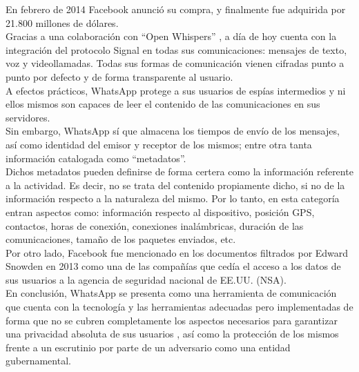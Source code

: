 En febrero de 2014 Facebook anunció su compra, y finalmente fue adquirida por 21.800 millones de dólares. \\

Gracias a una colaboración con \hyphenquote{spanish}{Open Whispers} \cite{WikiOpenWhisper}, a día de hoy cuenta con la integración del protocolo Signal \cite{WikiSignal} \cite{OWSWhatsApp01} \cite{OWSWhatsApp02} en todas sus comunicaciones: mensajes de texto, voz y videollamadas. Todas sus formas de comunicación vienen cifradas punto a punto por defecto y de forma transparente al usuario. \cite{WhatsAppWhitepaper} \cite{WhatsAppSecurity} \\

A efectos prácticos, WhatsApp protege a sus usuarios de espías intermedios y ni ellos mismos son capaces de leer el contenido de las comunicaciones en sus servidores. \\

Sin embargo, WhatsApp sí que almacena los tiempos de envío de los mensajes, así como identidad del emisor y receptor de los mismos; entre otra tanta información catalogada como \hyphenquote{spanish}{metadatos}. \\

Dichos metadatos pueden definirse de forma certera como la información referente a la actividad. Es decir, no se trata del contenido propiamente dicho, si no de la información respecto a la naturaleza del mismo. Por lo tanto, en esta categoría entran aspectos como: información respecto al dispositivo, posición GPS, contactos, horas de conexión, conexiones inalámbricas, duración de las comunicaciones, tamaño de los paquetes enviados, etc. \\

Por otro lado, Facebook fue mencionado en los documentos filtrados por Edward Snowden en 2013 como una de las compañías que cedía el acceso a los datos de sus usuarios a la agencia de seguridad nacional de EE.UU. (NSA). \cite{NSAGmailFacebook} \\

En conclusión, WhatsApp se presenta como una herramienta de comunicación que cuenta con la tecnología y las herramientas adecuadas \cite{OWSWhatsApp03} \cite{WhatsAppEncryptionTheIndependent} pero implementadas de forma que no se cubren completamente los aspectos necesarios para garantizar una privacidad absoluta de sus usuarios \cite{StopWhatsappTelegram}, así como la protección de los mismos frente a un escrutinio por parte de un adversario como una entidad gubernamental. \\

